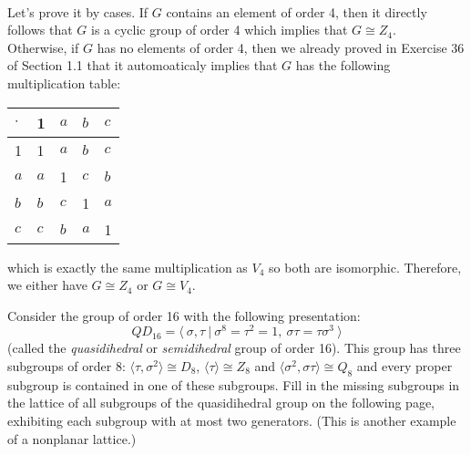 \begin{solution}
    \\ Let's prove it by cases. If $G$ contains an element of order 4, then it directly follows that $G$ is a cyclic group of order 4 which implies that $G \cong Z_4$. \\
    Otherwise, if $G$ has no elements of order 4, then we already proved in Exercise 36 of Section 1.1 that it automoaticaly implies that $G$ has the following multiplication table:
    \begin{table}[h!]
        \centering
        \begin{tabular}{l|l l l l}
        $\cdot$ & 1   & $a$ & $b$ & $c$ \\ \hline
        1       & 1   & $a$ & $b$ & $c$ \\ 
        $a$     & $a$ & 1   & $c$ & $b$ \\ 
        $b$     & $b$ & $c$ & 1   & $a$ \\ 
        $c$     & $c$ & $b$ & $a$ & 1  
        \end{tabular}
    \end{table}
    which is exactly the same multiplication as $V_4$ so both are isomorphic. Therefore, we either have $G \cong Z_4$ or $G \cong V_4$. \\
\end{solution}

\begin{exercise}
    Consider the group of order 16 with the following presentation:
    $$QD_{16} = \langle \ \sigma, \tau \ | \ \sigma^8 = \tau^2 = 1, \ \sigma\tau = \tau\sigma^3 \ \rangle$$
    (called the \textit{quasidihedral} or \textit{semidihedral} group of order 16). This group has three subgroups of order 8: $\langle \tau, \sigma^2 \rangle \cong D_8$, $\langle \tau \rangle \cong Z_8$ and $\langle \sigma^2, \sigma\tau \rangle \cong Q_8$ and every proper subgroup is contained in one of these subgroups. Fill in the missing subgroups in the lattice of all subgroups of the quasidihedral group on the following page, exhibiting each subgroup with at most two generators. (This is another example of a nonplanar lattice.) \\
\end{exercise}

